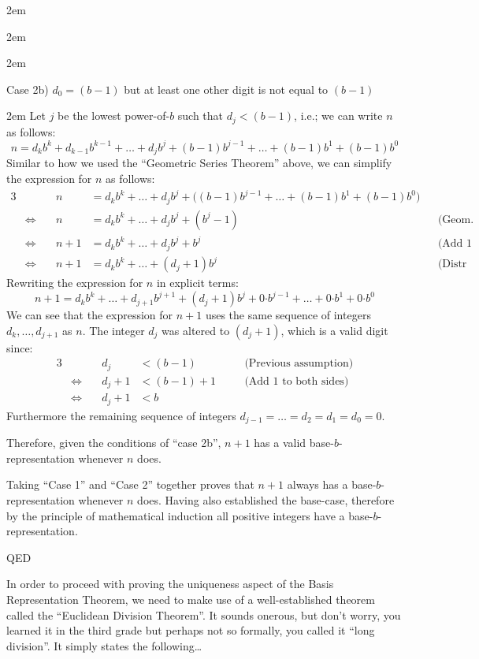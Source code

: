 \documentclass{article}
\newenvironment{jprIn}{\begin{adjustwidth}{2em}{}}{\end{adjustwidth}}
\begin{document}
\begin{jprIn}
\begin{jprIn}
\begin{jprIn}
\end{jprIn}
Case 2b) $d_0=(b-1)$ but at least one other digit is not equal to $(b-1)$
\begin{jprIn}
Let $j$ be the lowest power-of-$b$ such that $d_j<(b{-}1)$,
i.e.; we can write $n$ as follows:
\[n = d_kb^k+d_{k-1}b^{k-1}+\dots+d_jb^j+(b{-}1)b^{j-1}+\dots+(b{-}1)b^1+(b{-}1)b^0\]
Similar to how we used the ``Geometric Series Theorem'' above,
we can simplify the expression for $n$ as follows:
{\small
\begin{alignat*}{3}
  &&n
  &= d_kb^k+\dots+d_jb^j+\big((b{-}1)b^{j-1}+\dots+(b{-}1)b^1+(b{-}1)b^0\big)&&\\
  &\Leftrightarrow\quad
  &n
  &= d_kb^k+\dots+d_jb^j+(b^j-1) &&\text{(Geom. Series Thm.)}\\
  &\Leftrightarrow\quad
  &n+1
  &=  d_kb^k+\dots+d_jb^j+b^j &&\text{(Add 1 to both sides)}\\
  &\Leftrightarrow\quad
  &n+1
  &=  d_kb^k+\dots+(d_j+1)b^j &&\text{(Distr Axiom)}
\end{alignat*}
}Rewriting the expression for $n$ in explicit terms:
\[n+1= d_kb^k+\dots+d_{j+1}b^{j+1}+(d_j+1)b^j+0{\cdot{}}{}b^{j-1}+\dots{}+0{\cdot{}}b^1+0{\cdot{}}b^0\]
We can see that the expression for $n+1$ uses the same
sequence of integers $d_k,\dots{},d_{j+1}$ as $n$.
The integer $d_j$ was altered to $(d_j{+}1)$, which is a valid digit since:
\begin{alignat*}{3}
  &&d_j
  &< (b-1) &&\quad\text{(Previous assumption)}\\
  &\Leftrightarrow\quad
  &d_j+1
  &< (b-1)+1 &&\quad\text{(Add 1 to both sides)}\\  
  &\Leftrightarrow\quad
  &d_j+1
  &< b
\end{alignat*}
Furthermore the remaining sequence of integers $d_{j-1}=\dots{}=d_2=d_1=d_0=0$.

Therefore, given the conditions of ``case 2b'', $n+1$ has
a valid base-$b$-representation whenever $n$ does.
\end{jprIn}
\end{jprIn}
Taking ``Case 1'' and ``Case 2'' together proves that $n+1$
always has a base-$b$-representation whenever $n$ does.
Having also established the base-case, therefore by the principle of mathematical induction
all positive integers have a base-$b$-representation.

QED
\end{jprIn}

\bigskip
In order to proceed
with proving the uniqueness aspect of the Basis Representation Theorem, we
need to make use of a well-established theorem
called the ``Euclidean Division Theorem''.
It sounds onerous, but don't worry, you learned it
in the third grade but perhaps not so formally, you called it ``long division''. It simply states the following\dots{}
\end{document}
